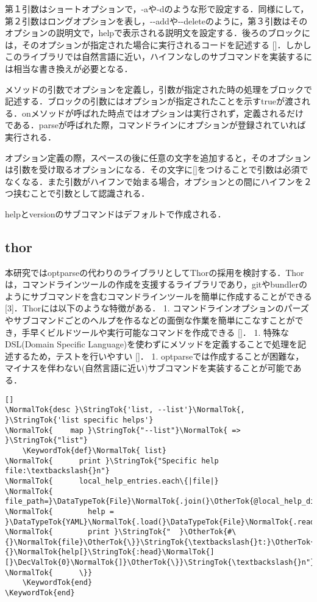 \documentclass[11pt,dvipdfmx]{jsarticle}
\newcommand{\KeywordTok}[1]{\textcolor[rgb]{0.00,0.44,0.13}{\textbf{{#1}}}}
\newcommand{\DataTypeTok}[1]{\textcolor[rgb]{0.56,0.13,0.00}{{#1}}}
\newcommand{\DecValTok}[1]{\textcolor[rgb]{0.25,0.63,0.44}{{#1}}}
\newcommand{\StringTok}[1]{\textcolor[rgb]{0.25,0.44,0.63}{{#1}}}
\newcommand{\OtherTok}[1]{\textcolor[rgb]{0.00,0.44,0.13}{{#1}}}
\newcommand{\NormalTok}[1]{{#1}}
\begin{document}
第１引数はショートオプションで，-aや-dのような形で設定する．同様にして，第２引数はロングオプションを表し，-\/-addや-\/-deleteのように，第３引数はそのオプションの説明文で，helpで表示される説明文を設定する．後ろのブロックには，そのオプションが指定された場合に実行されるコードを記述する
{[}{]}．しかしこのライブラリでは自然言語に近い，ハイフンなしのサブコマンドを実装するには相当な書き換えが必要となる．

メソッドの引数でオプションを定義し，引数が指定された時の処理をブロックで記述する．ブロックの引数にはオプションが指定されたことを示すtrueが渡される．onメソッドが呼ばれた時点ではオプションは実行されず，定義されるだけである．parseが呼ばれた際，コマンドラインにオプションが登録されていれば実行される．

オプション定義の際，スペースの後に任意の文字を追加すると，そのオプションは引数を受け取るオプションになる．その文字に{[}{]}をつけることで引数は必須でなくなる．また引数がハイフンで始まる場合，オプションとの間にハイフンを２つ挟むことで引数として認識される．

helpとversionのサブコマンドはデフォルトで作成される．

\subsection{thor}\label{thor}

本研究ではoptparseの代わりのライブラリとしてThorの採用を検討する．Thorは，コマンドラインツールの作成を支援するライブラリであり，gitやbundlerのようにサブコマンドを含むコマンドラインツールを簡単に作成することができる
{[}3{]}．Thorには以下のような特徴がある． 1.
コマンドラインオプションのパーズやサブコマンドごとのヘルプを作るなどの面倒な作業を簡単にこなすことができ，手早くビルドツールや実行可能なコマンドを作成できる
{[}{]}． 1. 特殊なDSL(Domain Specific
Language)を使わずにメソッドを定義することで処理を記述するため，テストを行いやすい
{[}{]}． 1.
optparseでは作成することが困難な，マイナスを伴わない(自然言語に近い)サブコマンドを実装することが可能である．

\begin{screen}
{\small
\begin{verbatim}[]
\NormalTok{desc }\StringTok{'list, --list'}\NormalTok{, }\StringTok{'list specific helps'}
\NormalTok{    map }\StringTok{"--list"}\NormalTok{ => }\StringTok{"list"}
    \KeywordTok{def}\NormalTok{ list}
\NormalTok{      print }\StringTok{"Specific help file:\textbackslash{}n"}
\NormalTok{      local_help_entries.each\{|file|}
\NormalTok{        file_path=}\DataTypeTok{File}\NormalTok{.join(}\OtherTok{@local_help_dir}\NormalTok{,file)}
\NormalTok{        help = }\DataTypeTok{YAML}\NormalTok{.load(}\DataTypeTok{File}\NormalTok{.read(file_path))}
\NormalTok{        print }\StringTok{"  }\OtherTok{#\{}\NormalTok{file}\OtherTok{\}}\StringTok{\textbackslash{}t:}\OtherTok{#\{}\NormalTok{help[}\StringTok{:head}\NormalTok{][}\DecValTok{0}\NormalTok{]}\OtherTok{\}}\StringTok{\textbackslash{}n"}
\NormalTok{      \}}
    \KeywordTok{end}
\KeywordTok{end}
\end{verbatim}}
\end{screen}
\end{document}
